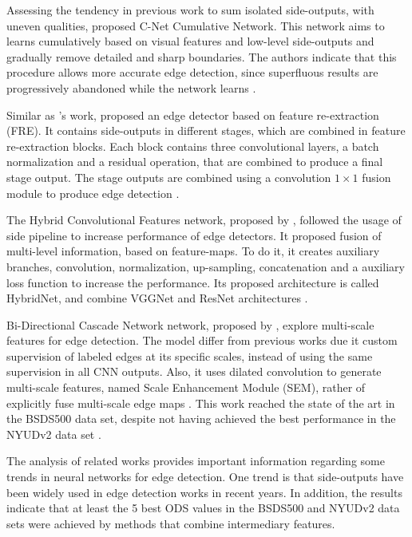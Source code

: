 Assessing the tendency in previous work to sum isolated side-outputs, with uneven qualities, \cite{Cumulative:Song20181847} proposed C-Net Cumulative Network.
This network aims to learns cumulatively based on visual features and low-level side-outputs and gradually remove detailed and sharp boundaries.
The authors indicate that this procedure allows more accurate edge detection, since superfluous results are progressively abandoned while the network learns \cite{Cumulative:Song20181847}.

Similar as \cite{Cumulative:Song20181847}'s work, \cite{ReExtraction:Wen201884} proposed an edge detector based on feature re-extraction (FRE).
It contains side-outputs in different stages, which are combined in feature re-extraction blocks.
Each block contains three convolutional layers, a batch normalization and a residual operation, that are combined to produce a final stage output.
The stage outputs are combined using a convolution $1 \times 1$ fusion module to produce edge detection \cite{ReExtraction:Wen201884}.

The Hybrid Convolutional Features network, proposed by \cite{LearningHybrid:Hu2018377}, followed the usage of side pipeline to increase performance of edge detectors.
It proposed fusion of multi-level information, based on feature-maps.
To do it, it creates auxiliary branches, convolution, normalization, up-sampling, concatenation and a auxiliary loss function to increase the performance.
Its proposed architecture is called HybridNet, and combine VGGNet and ResNet architectures \cite{LearningHybrid:Hu2018377}. 

Bi-Directional Cascade Network network, proposed by \cite{He:2019}, explore multi-scale features for edge detection.
The model differ from previous works due it custom supervision of labeled edges at its specific scales, instead of using the same supervision in all CNN outputs.
Also, it uses dilated convolution to generate multi-scale features, named Scale Enhancement Module (SEM), rather of explicitly fuse multi-scale edge maps \cite{He:2019}.
This work reached the state of the art in the BSDS500 data set, despite not having achieved the best performance in the NYUDv2 data set \cite{Silberman:ECCV12}. %

%

The analysis of related works provides important information regarding some trends in neural networks for edge detection.
One trend is that side-outputs have been widely used in edge detection works in recent years.
In addition, the results indicate that at least the 5 best ODS values in the BSDS500 and NYUDv2 data sets were achieved by methods that combine intermediary features.


